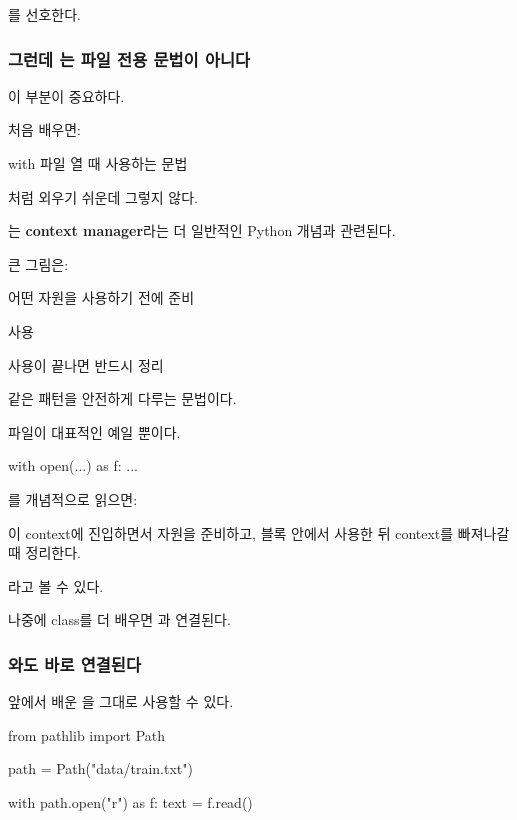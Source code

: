 를 선호한다.

\subsubsection{그런데 는 파일 전용 문법이 아니다}

이 부분이 중요하다.

처음 배우면:

\begin{dhksmry}[centered]
with \ra 파일 열 때 사용하는 문법
\end{dhksmry}

처럼 외우기 쉬운데 그렇지 않다.

는 \textbf{context manager}라는 더 일반적인 Python 개념과 관련된다.

큰 그림은:

\begin{dhksmry}[centered]
어떤 자원을 사용하기 전에 준비

\da

사용

\da

사용이 끝나면 반드시 정리
\end{dhksmry}

같은 패턴을 안전하게 다루는 문법이다.

파일이 대표적인 예일 뿐이다.

\begin{dhkcode}
with open(...) as f:
    ...
\end{dhkcode}

를 개념적으로 읽으면:

\begin{dhknote}
\begin{dhksmry}
이 context에 진입하면서 자원을 준비하고, 
블록 안에서 사용한 뒤 context를 빠져나갈 때 정리한다.
\end{dhksmry}
\end{dhknote}

라고 볼 수 있다.

나중에 class를 더 배우면 과 연결된다.

\subsubsection{와도 바로 연결된다}

앞에서 배운 을 그대로 사용할 수 있다.

\begin{dhkcode}
from pathlib import Path

path = Path("data/train.txt")

with path.open("r") as f:
    text = f.read()
\end{dhkcode}


